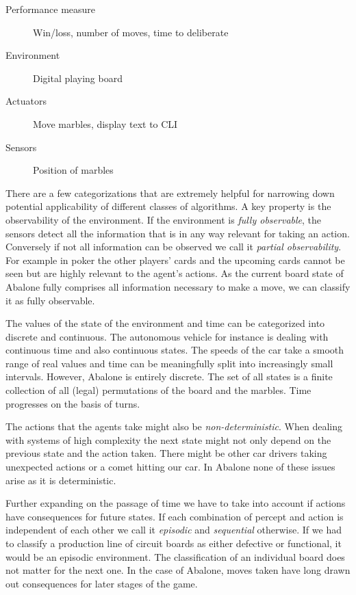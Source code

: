 \begin{description}
    \item[Performance measure] Win/loss, number of moves, time to deliberate
    \item[Environment] Digital playing board
    \item[Actuators] Move marbles, display text to CLI
    \item[Sensors] Position of marbles
\end{description}

There are a few categorizations that are extremely helpful for narrowing down potential applicability of different classes of algorithms. A key property is the observability of the environment. If the environment is \textit{fully observable}, the sensors detect all the information that is in any way relevant for taking an action. Conversely if not all information can be observed we call it \textit{partial observability}. For example in poker the other players' cards and the upcoming cards cannot be seen but are highly relevant to the agent's actions. As the current board state of Abalone fully comprises all information necessary to make a move, we can classify it as fully observable.

The values of the state of the environment and time can be categorized into discrete and continuous. The autonomous vehicle for instance is dealing with continuous time and also continuous states. The speeds of the car take a smooth range of real values and time can be meaningfully split into increasingly small intervals. However, Abalone is entirely discrete. The set of all states is a finite collection of all (legal) permutations of the board and the marbles. Time progresses on the basis of turns.

The actions that the agents take might also be \textit{non-deterministic}. When dealing with systems of high complexity the next state might not only depend on the previous state and the action taken. There might be other car drivers taking unexpected actions or a comet hitting our car. In Abalone none of these issues arise as it is deterministic.

Further expanding on the passage of time we have to take into account if actions have consequences for future states. If each combination of percept and action is independent of each other we call it \textit{episodic} and \textit{sequential} otherwise. If we had to classify a production line of circuit boards as either defective or functional, it would be an episodic environment. The classification of an individual board does not matter for the next one. In the case of Abalone, moves taken have long drawn out consequences for later stages of the game.


